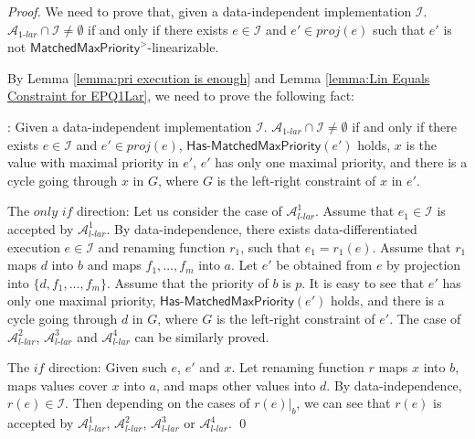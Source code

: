 \begin {proof}

We need to prove that, given a data-independent implementation $\mathcal{I}$. $\mathcal{A}_{\textit{1-lar}} \cap \mathcal{I} \neq \emptyset$ if and only if there exists $e \in \mathcal{I}$ and $e' \in \textit{proj}(e)$ such that $e'$ is not $\mathsf{MatchedMaxPriority}^{>}$-linearizable.

By Lemma \ref{lemma:pri execution is enough} and Lemma \ref{lemma:Lin Equals Constraint for EPQ1Lar}, we need to prove the following fact:

: Given a data-independent implementation $\mathcal{I}$. $\mathcal{A}_{\textit{1-lar}} \cap \mathcal{I} \neq \emptyset$ if and only if there exists $e \in \mathcal{I}$ and $e' \in \textit{proj}(e)$, $\mathsf{Has\text{-}MatchedMaxPriority}(e')$ holds, $x$ is the value with maximal priority in $e'$, $e'$ has only one maximal priority, and there is a cycle going through $x$ in $G$, where $G$ is the left-right constraint of $x$ in $e'$.

\noindent The $\textit{only if}$ direction: Let us consider the case of $\mathcal{A}_{\textit{l-lar}}^1$. Assume that $e_1 \in \mathcal{I}$ is accepted by $\mathcal{A}_{\textit{l-lar}}^1$. By data-independence, there exists data-differentiated execution $e \in \mathcal{I}$ and renaming function $r_1$, such that $e_1 = r_1(e)$. Assume that $r_1$ maps $d$ into $b$ and maps $f_1,\ldots,f_m$ into $a$. Let $e'$ be obtained from $e$ by projection into $\{ d, f_1,\ldots,f_m \}$. Assume that the priority of $b$ is $p$. It is easy to see that $e'$ has only one maximal priority, $\mathsf{Has\text{-}MatchedMaxPriority}(e')$ holds, and there is a cycle going through $d$ in $G$, where $G$ is the left-right constraint of $e'$. The case of $\mathcal{A}_{\textit{l-lar}}^2$, $\mathcal{A}_{\textit{l-lar}}^3$ and $\mathcal{A}_{\textit{l-lar}}^4$ can be similarly proved.

\noindent The $\textit{if}$ direction: Given such $e$, $e'$ and $x$. Let renaming function $r$ maps $x$ into $b$, maps values cover $x$ into $a$, and maps other values into $d$. By data-independence, $r(e) \in \mathcal{I}$. Then depending on the cases of $r(e) \vert_{b}$, we can see that $r(e)$ is accepted by $\mathcal{A}_{\textit{l-lar}}^1$, $\mathcal{A}_{\textit{l-lar}}^2$, $\mathcal{A}_{\textit{l-lar}}^3$ or $\mathcal{A}_{\textit{l-lar}}^4$. \qed
\end {proof}




